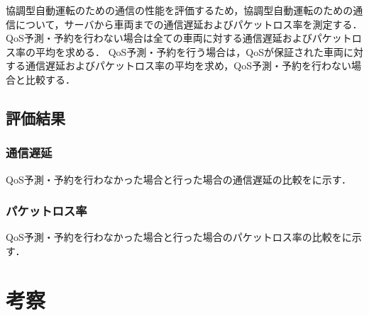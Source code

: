\documentclass[a4paper,11pt,uplatex]{ujreport}
\begin{document}
  協調型自動運転のための通信の性能を評価するため，協調型自動運転のための通信について，サーバから車両までの通信遅延およびパケットロス率を測定する．
  QoS予測・予約を行わない場合は全ての車両に対する通信遅延およびパケットロス率の平均を求める．
  QoS予測・予約を行う場合は，QoSが保証された車両に対する通信遅延およびパケットロス率の平均を求め，QoS予測・予約を行わない場合と比較する．


\section{評価結果}
\label{sec:評価結果}

\subsection{通信遅延}

  QoS予測・予約を行わなかった場合と行った場合の通信遅延の比較をに示す．


\subsection{パケットロス率}

  QoS予測・予約を行わなかった場合と行った場合のパケットロス率の比較をに示す．








\chapter{考察}
\label{chap:考察}
\end{document}

